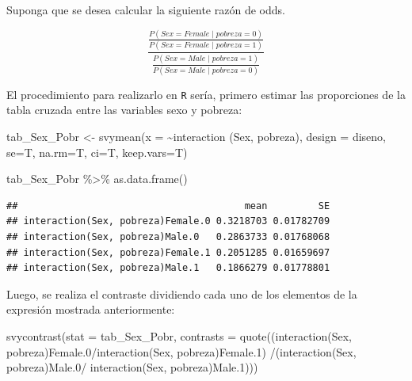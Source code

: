 \documentclass[
  12pt,
]{book}
\newenvironment{Shaded}{\begin{snugshade}}{\end{snugshade}}
\newcommand{\AttributeTok}[1]{\textcolor[rgb]{0.77,0.63,0.00}{#1}}
\newcommand{\FunctionTok}[1]{\textcolor[rgb]{0.00,0.00,0.00}{#1}}
\newcommand{\NormalTok}[1]{#1}
\newcommand{\OtherTok}[1]{\textcolor[rgb]{0.56,0.35,0.01}{#1}}
\newcommand{\SpecialCharTok}[1]{\textcolor[rgb]{0.00,0.00,0.00}{#1}}
\newcommand{\StringTok}[1]{\textcolor[rgb]{0.31,0.60,0.02}{#1}}
\begin{document}
Suponga que se desea calcular la siguiente razón de odds.

\[
 \frac{\frac{P(Sex = Female \mid pobreza = 0 )}{P(Sex = Female \mid pobreza = 1 )}}{
 \frac{P(Sex = Male \mid pobreza = 1 )}{P(Sex = Male \mid pobreza = 0 )}
 }
\]

El procedimiento para realizarlo en \texttt{R} sería, primero estimar las proporciones de la tabla cruzada entre las variables sexo y pobreza:

\begin{Shaded}
\begin{Highlighting}[]
\NormalTok{tab\_Sex\_Pobr }\OtherTok{\textless{}{-}} \FunctionTok{svymean}\NormalTok{(}\AttributeTok{x =} \SpecialCharTok{\textasciitilde{}}\FunctionTok{interaction}\NormalTok{ (Sex, pobreza), }\AttributeTok{design =}\NormalTok{ diseno, }
                        \AttributeTok{se=}\NormalTok{T, }\AttributeTok{na.rm=}\NormalTok{T, }\AttributeTok{ci=}\NormalTok{T, }\AttributeTok{keep.vars=}\NormalTok{T)}

\NormalTok{tab\_Sex\_Pobr }\SpecialCharTok{\%\textgreater{}\%}  \FunctionTok{as.data.frame}\NormalTok{()}
\end{Highlighting}
\end{Shaded}

\begin{verbatim}
##                                        mean         SE
## interaction(Sex, pobreza)Female.0 0.3218703 0.01782709
## interaction(Sex, pobreza)Male.0   0.2863733 0.01768068
## interaction(Sex, pobreza)Female.1 0.2051285 0.01659697
## interaction(Sex, pobreza)Male.1   0.1866279 0.01778801
\end{verbatim}

Luego, se realiza el contraste dividiendo cada uno de los elementos de la expresión mostrada anteriormente:

\begin{Shaded}
\begin{Highlighting}[]
\FunctionTok{svycontrast}\NormalTok{(}\AttributeTok{stat =}\NormalTok{ tab\_Sex\_Pobr, }
\AttributeTok{contrasts =} \FunctionTok{quote}\NormalTok{((}\StringTok{\textasciigrave{}}\AttributeTok{interaction(Sex, pobreza)Female.0}\StringTok{\textasciigrave{}}\SpecialCharTok{/}\StringTok{\textasciigrave{}}\AttributeTok{interaction(Sex, pobreza)Female.1}\StringTok{\textasciigrave{}}\NormalTok{) }\SpecialCharTok{/}\NormalTok{(}\StringTok{\textasciigrave{}}\AttributeTok{interaction(Sex, pobreza)Male.0}\StringTok{\textasciigrave{}}\SpecialCharTok{/} \StringTok{\textasciigrave{}}\AttributeTok{interaction(Sex, pobreza)Male.1}\StringTok{\textasciigrave{}}\NormalTok{)))}
\end{Highlighting}
\end{Shaded}
\end{document}
